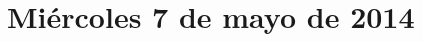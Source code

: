 \documentclass[12pt,spanish]{article}
\begin{document}
  \thispagestyle{empty}
  \pagestyle{empty}
  \section*{Miércoles 7 de mayo de 2014}

  \begin{certamen}[start=0]
    \item
      
      \newpage
    \item
      
      \newpage
    \item
      
      \newpage
  \end{certamen}
\end{document}
